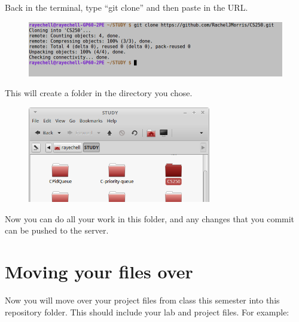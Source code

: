 \documentclass[a4paper,12pt,oneside]{book}
\begin{document}
            Back in the terminal, type ``git clone'' and then paste
            in the URL.

                \begin{figure}[h]
                    \centering
                    \includegraphics[width=14cm]{images/git-cl-clone.png}
                \end{figure}

            This will create a folder in the directory you chose.

                \begin{figure}[h]
                    \centering
                    \includegraphics[width=8cm]{images/git-directory.png}
                \end{figure}

            Now you can do all your work in this folder, and any changes
            that you commit can be pushed to the server.

    \newpage

    \section{Moving your files over}
    
        Now you will move over your project files from class this semester
        into this repository folder. This should include your lab and project
        files. For example:

        \renewcommand*\DTstylecomment{\rmfamily\color{green}\textsc}

        \begin{framed}
        \end{framed}
\end{document}
